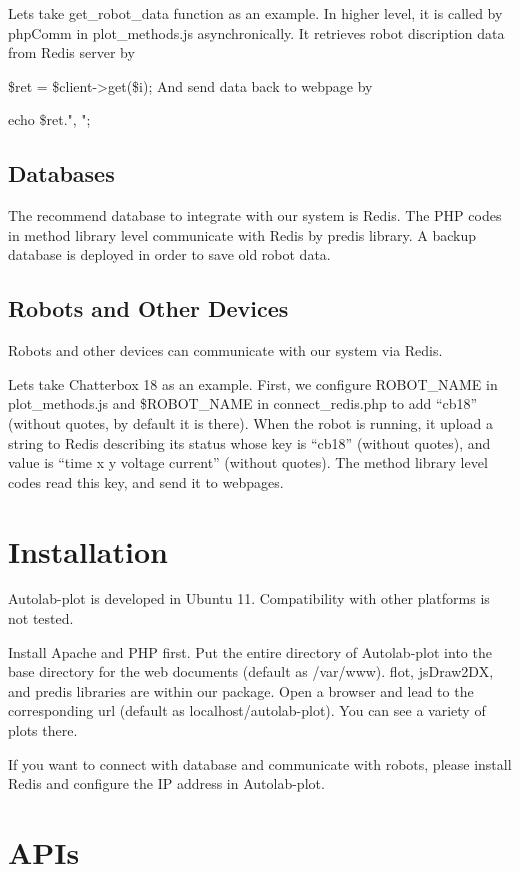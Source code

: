 \documentclass{article}
\begin{document}
Lets take get\_robot\_data function as an example.
In higher level, it is called by phpComm in plot\_methods.js asynchronically.
It retrieves robot discription data from Redis server by
\item{\$ret = \$client->get(\$i);}
And send data back to webpage by
\item{echo \$ret.", ";}

\subsection{Databases}
The recommend database to integrate with our system is Redis.
The PHP codes in method library level communicate with Redis by predis library.
A backup database is deployed in order to save old robot data.

\subsection{Robots and Other Devices}
Robots and other devices can communicate with our system via Redis.

Lets take Chatterbox 18 as an example.
First, we configure ROBOT\_NAME in plot\_methods.js and \$ROBOT\_NAME in connect\_redis.php to add ``cb18'' (without quotes, by default it is there).
When the robot is running, it upload a string to Redis describing its status whose key is ``cb18'' (without quotes), and value is ``time x y voltage current'' (without quotes).
The method library level codes read this key, and send it to webpages.

\section{Installation}
Autolab-plot is developed in Ubuntu 11.
Compatibility with other platforms is not tested.

Install Apache and PHP first.
Put the entire directory of Autolab-plot into the base directory for the web documents (default as /var/www).
flot, jsDraw2DX, and predis libraries are within our package.
Open a browser and lead to the corresponding url (default as localhost/autolab-plot).
You can see a variety of plots there.

If you want to connect with database and communicate with robots, please install Redis and configure the IP address in Autolab-plot.

\section{APIs}
\end{document}
